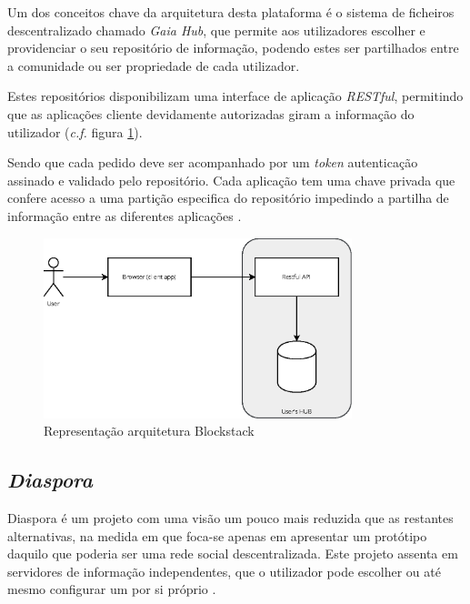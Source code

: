 Um dos conceitos chave da arquitetura desta plataforma é o sistema de ficheiros descentralizado chamado \emph{Gaia Hub}, que permite aos utilizadores escolher e providenciar o seu repositório de informação, podendo estes ser partilhados entre a comunidade ou ser propriedade de cada utilizador.

Estes repositórios disponibilizam uma interface de aplicação \emph{RESTful}, permitindo que as aplicações cliente devidamente autorizadas giram a informação do utilizador (\emph{c.f.} figura \ref{estado_arte_representacao_blockstack}).

Sendo que cada pedido deve ser acompanhado por um \emph{token} autenticação assinado e validado pelo repositório. Cada aplicação tem uma chave privada que confere acesso a uma partição especifica do repositório impedindo a partilha de informação entre as diferentes aplicações \cite{blockstack_white_paper}.

\begin{figure}[H]
    \begin{center}
    \includegraphics[width=0.8\textwidth]{figures/estado_arte-Blockstack.eps}
    \caption{Representação arquitetura Blockstack}
    \label{estado_arte_representacao_blockstack}
    \end{center}
\end{figure}

\subsection{\emph{Diaspora}}
Diaspora é um projeto com uma visão um pouco mais reduzida que as restantes alternativas, na medida em que foca-se apenas em apresentar um protótipo daquilo que poderia ser uma rede social descentralizada. Este projeto assenta em servidores de informação independentes, que o utilizador pode escolher ou até mesmo configurar um por si próprio \cite{diaspora_wiki}.


